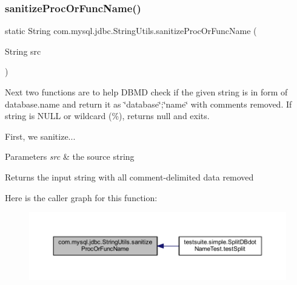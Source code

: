 \subsubsection{\texorpdfstring{sanitize\+Proc\+Or\+Func\+Name()}{sanitizeProcOrFuncName()}}
{\footnotesize\ttfamily static String com.\+mysql.\+jdbc.\+String\+Utils.\+sanitize\+Proc\+Or\+Func\+Name (\begin{DoxyParamCaption}\item[{String}]{src }\end{DoxyParamCaption})\hspace{0.3cm}{\ttfamily [static]}}

Next two functions are to help D\+B\+MD check if the given string is in form of database.\+name and return it as \char`\"{}database\char`\"{};\char`\"{}name\char`\"{} with comments removed. If string is N\+U\+LL or wildcard (\%), returns null and exits.

First, we sanitize...


\begin{DoxyParams}{Parameters}
{\em src} & the source string \\
\hline
\end{DoxyParams}
\begin{DoxyReturn}{Returns}
the input string with all comment-\/delimited data removed 
\end{DoxyReturn}
Here is the caller graph for this function\+:
\nopagebreak
\begin{figure}[H]
\begin{center}
\leavevmode
\includegraphics[width=350pt]{classcom_1_1mysql_1_1jdbc_1_1_string_utils_a5a12075fbc5dc15fb882600f8d424f39_icgraph}
\end{center}
\end{figure}
\mbox{\label{classcom_1_1mysql_1_1jdbc_1_1_string_utils_a9585acb209b381778e2d9ffde265e2f9}} 
